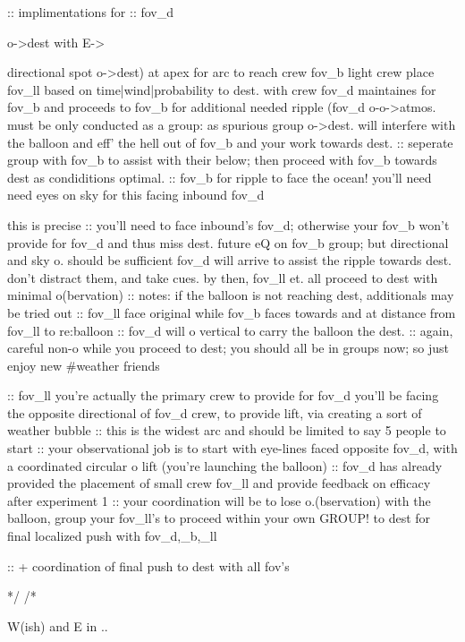 {{{{{{{:: implimentations for
   :: fov_d
	{ o->dest with E-> {{ directional spot o->dest) at apex for arc to reach crew fov_b {light crew} 
        place fov_ll based on {time|wind|probability to dest. with crew}
        fov_d maintaines for fov_b and proceeds to fov_b for additional needed ripple
         (fov_d o-o->atmos. must be only conducted as a group: as spurious group o->dest. will interfere with the balloon
           and eff' the hell out of fov_b and your work towards dest. 
         :: seperate group with fov_b to assist with {their below}; then proceed with fov_b towards dest as condiditions optimal.
   :: fov_b
          for ripple to {face the ocean!} {you'll need need eyes on sky for this facing inbound fov_d}
          {this is precise :: you'll need to face inbound's fov_d; otherwise your fov_b won't provide for fov_d
           and thus miss dest.
	  {future eQ on fov_b group; but directional and sky o. should be sufficient}
          fov_d will arrive to assist the ripple towards dest.  don't distract them, and take cues.
          by then, fov_ll et. all proceed to dest with minimal o(bervation)
          :: notes: if the balloon is not reaching dest, additionals may be tried out
             :: fov_ll face original while fov_b faces towards and at distance from fov_ll to re:balloon
             :: fov_d will o vertical to carry the balloon the dest.
             :: again, careful non-o while you proceed to dest;  you should all be in groups now; so just enjoy new #weather friends

   :: fov_ll
          {you're actually the primary crew to provide for fov_d}
          you'll be facing the opposite directional of fov_d crew, to provide lift, via
            creating a sort of weather bubble
          :: this is the widest arc and should be limited to say 5 people to start
             :: your observational job is to start with eye-lines faced opposite fov_d, with a coordinated circular
                o lift
                (you're launching the balloon)
             :: fov_d has already provided the placement of small crew fov_ll and provide feedback on efficacy after {experiment 1}
          :: your coordination will be to lose o.(bservation) with the balloon, group your fov_ll's to proceed within your own
             {GROUP!} to dest for final localized push with fov_d,_b,_ll
 
   :: + coordination of final push to dest with all fov's

*/ /*

{W(ish) and E in .. }


}}}}}}}}}}}

